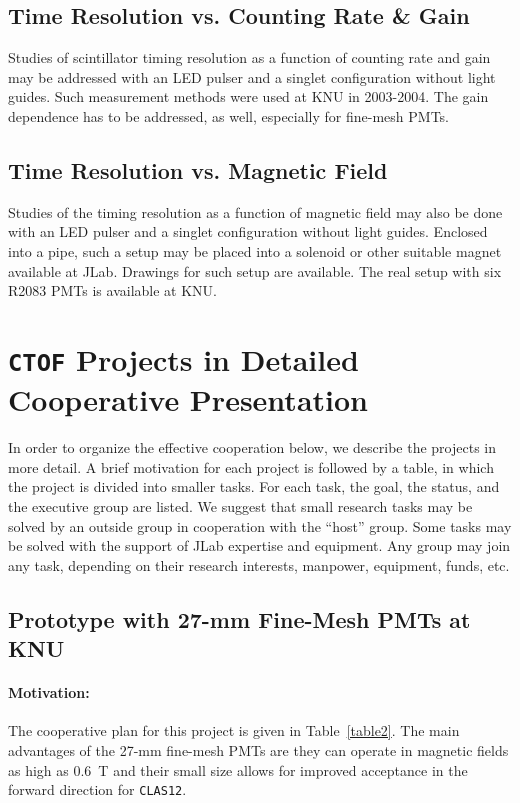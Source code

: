 \documentclass[12pt]{article}
\begin{document}
\subsection{Time Resolution vs. Counting Rate \& Gain} 

Studies of scintillator timing resolution as a function of counting rate
and gain may be addressed with an LED pulser and a singlet configuration 
without light guides.  Such measurement methods were used at KNU in 
2003-2004.  The gain dependence has to be addressed, as well, especially for 
fine-mesh PMTs.

\subsection{Time Resolution vs. Magnetic Field}  

Studies of the timing resolution as a function of magnetic field may also
be done with an LED pulser and a singlet configuration without light guides. 
Enclosed into a pipe, such a setup may be placed into a solenoid or other 
suitable magnet available at JLab.  Drawings for such setup are available.
The real setup with six R2083 PMTs is available at KNU.

\section{{\tt CTOF} Projects in Detailed Cooperative Presentation}
\label{coopro}

In order to organize the effective cooperation below, we describe the 
projects in more detail.  A brief motivation for each project is followed 
by a table, in which the project is divided into smaller tasks.  For each 
task, the goal, the status, and the executive group are listed.  We suggest 
that small research tasks may be solved by an outside group in cooperation 
with the ``host'' group.  Some tasks may be solved with the support of JLab 
expertise and equipment.  Any group may join any task, depending on their  
research interests, manpower, equipment, funds, etc. 

\subsection{Prototype with 27-mm Fine-Mesh PMTs at KNU} 

\paragraph{Motivation:}
The cooperative plan for this project is given in Table~\ref{table2}.  The 
main advantages of the 27-mm fine-mesh PMTs are they can operate in magnetic 
fields as high as 0.6~T and their small size allows for improved acceptance
in the forward direction for {\tt CLAS12}. 
\end{document}
